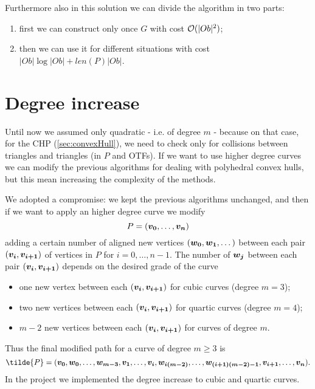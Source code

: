\documentclass[dissertation.tex]{subfiles}
\begin{document}
Furthermore also in this solution
we can divide the algorithm in two parts:
\begin{enumerate}
\item first we can construct only once $G$ with cost $\mathcal{O}(|Ob|^2)$;
\item then we can use it for different situations with cost
  $|Ob|\log|Ob|+len(P)|Ob|$.
\end{enumerate}

\section{Degree increase}\label{sec:degreeInc}
Until now we assumed only quadratic \bss{} - i.e. of degree $m$ - because
on that case,
for the \ac{CHP} (\cref{sec:convexHull}),
we need to check only for collisions between triangles and triangles
(in $P$ and \acp{OTF}). If we want to use higher degree
curves we can modify the
previous algorithms for dealing with polyhedral convex hulls, but this
mean increasing the complexity of the methods.

We adopted a compromise: we kept the previous algorithms unchanged, and
then if we want to apply an higher degree \bs curve we modify 
\begin{equation*}
P=(\boldsymbol{v_0},\dots,\boldsymbol{v_n})  
\end{equation*}
adding a certain number of aligned new vertices
$(\boldsymbol{w_0},\boldsymbol{w_1},\dots)$ between each pair 
$(\boldsymbol{v_i},\boldsymbol{v_{i+1}})$ of vertices in $P$ for $i=0,\dots,n-1$. The
number of $\boldsymbol{w_j}$
between each pair $(\boldsymbol{v_i},\boldsymbol{v_{i+1}})$ depends on the desired
grade of the curve
\begin{itemize}
\item one new vertex between each $(\boldsymbol{v_i},\boldsymbol{v_{i+1}})$ for cubic
  \bs curves (degree $m=3$);
\item two new vertices between each $(\boldsymbol{v_i},\boldsymbol{v_{i+1}})$ for quartic
  \bs curves (degree $m=4$);
\item $m-2$ new vertices between each $(\boldsymbol{v_i},\boldsymbol{v_{i+1}})$ for
  \bs curves of degree $m$.
\end{itemize}
Thus the final modified path for a \bs curve of degree $m\ge 3$ is
\begin{equation*}
  \tilde{P}=(\ve{v_0},\ve{w_0},\dots,\ve{w_{m-3}},\ve{v_1},\dots,\ve{v_i},\ve{w_{i(m-2)}},\dots,\ve{w_{(i+1)(m-2)-1}},\ve{v_{i+1}},\dots,\ve{v_n}).
\end{equation*}
In the project we implemented the degree increase to cubic and quartic
curves.
\end{document}
